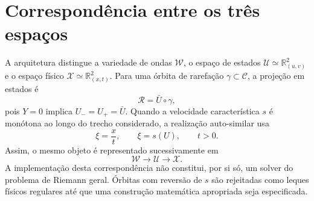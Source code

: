 \section{Correspondência entre os três espaços}
A arquitetura distingue a variedade de ondas $\mathcal W$, o espaço de estados
$\mathcal U\simeq\mathbb R^2_{(u,v)}$ e o espaço físico
$\mathcal X\simeq\mathbb R^2_{(x,t)}$.  Para uma órbita de rarefação
$\gamma\subset\mathcal C$, a projeção em estados é
\[
  \mathcal R=\bar U\circ\gamma,
\]
pois $Y=0$ implica $U_-=U_+=\bar U$.  Quando a velocidade característica
$s$ é monótona ao longo do trecho considerado, a realização auto-similar usa
\[
  \xi=\frac{x}{t},\qquad \xi=s(U),\qquad t>0.
\]
Assim, o mesmo objeto é representado sucessivamente em
\[
  \mathcal W\longrightarrow\mathcal U\longrightarrow\mathcal X.
\]
A implementação desta correspondência não constitui, por si só, um solver do
problema de Riemann geral. Órbitas com reversão de $s$ são rejeitadas como
leques físicos regulares até que uma construção matemática apropriada seja
especificada.
